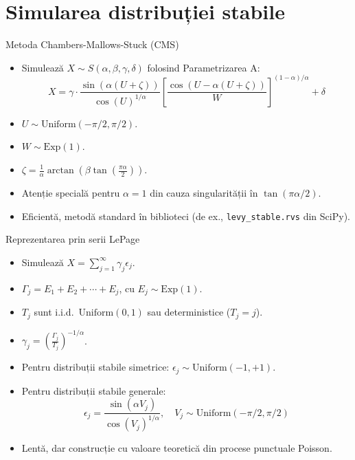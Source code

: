 \documentclass[9pt, aspectratio=169, t]{beamer}
\theoremstyle{definition}
\begin{document}
\section{Simularea distribuției stabile}

\begin{frame}{Metoda Chambers-Mallows-Stuck (CMS)}
\begin{itemize}
    \item Simulează $X \sim S(\alpha, \beta, \gamma, \delta)$ folosind Parametrizarea A:
    \[
        X = \gamma \cdot \frac{\sin(\alpha(U + \zeta))}{\cos(U)^{1/\alpha}}\left[\frac{\cos(U - \alpha(U+\zeta))}{W}\right]^{(1-\alpha)/\alpha} + \delta
    \]
    \item $U \sim \text{Uniform}(-\pi/2, \pi/2)$.
    \item $W \sim \text{Exp}(1)$.
    \item $\zeta = \frac{1}{\alpha}\arctan\left(\beta\tan\left(\frac{\pi\alpha}{2}\right)\right)$.
    \item Atenție specială pentru $\alpha = 1$ din cauza singularității în $\tan(\pi\alpha/2)$.
    \item Eficientă, metodă standard în biblioteci (de ex., \texttt{levy\_stable.rvs} din SciPy).
\end{itemize}
\end{frame}

\begin{frame}{Reprezentarea prin serii LePage}
\begin{itemize}
    \item Simulează $X = \sum_{j=1}^\infty \gamma_j \epsilon_j$.
    \item $\Gamma_j = E_1 + E_2 + \cdots + E_j$, cu $E_j \sim \text{Exp}(1)$.
    \item $T_j$ sunt i.i.d.\ $\text{Uniform}(0,1)$ sau deterministice ($T_j = j$).
    \item $\gamma_j = \left(\frac{\Gamma_j}{T_j}\right)^{-1/\alpha}$.
    \item Pentru distribuții stabile simetrice: $\epsilon_j \sim \text{Uniform}(-1, +1)$.
    \item Pentru distribuții stabile generale:
    \[
        \epsilon_j = \frac{\sin(\alpha V_j)}{\cos(V_j)^{1/\alpha}}, \quad V_j \sim \text{Uniform}(-\pi/2, \pi/2)
    \]
    \item Lentă, dar construcție cu valoare teoretică din procese punctuale Poisson.
\end{itemize}
\end{frame}
\end{document}
